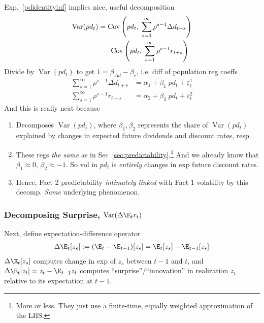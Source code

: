 \documentclass[12pt]{article}
\theoremstyle{plain}
\theoremstyle{definition}
\theoremstyle{remark}
\newcommand{\Cov}{\operatorname{Cov}}
\newcommand{\Var}{\operatorname{Var}}
\begin{document}
\begin{multicols*}{2}
Exp.~\ref{pdidentityinf} implies nice, useful decomposition
\begin{align}
  \Var(pd_t)
  &=
  \Cov\left(
    pd_t,\;
    \sum_{s=1}^\infty \rho^{s-1}\Delta d_{t+s}
  \right)
  \notag
  \\
  &\;\;
  -
  \Cov\left(
    pd_t,\;
    \sum_{s=1}^\infty \rho^{s-1}r_{t+s}
  \right)
  \notag
\end{align}
Divide by $\Var(pd_t)$ to get $1=\beta_{\Delta d}-\beta_{r}$, i.e.  diff
of population reg coeffs
\begin{align*}
  \sum_{s=1}^\infty \rho^{s-1}\Delta d_{t+s}
  &= \alpha_{1} + \beta_{1}\; pd_t
  + \varepsilon^{1}_t
  \\
  \sum_{s=1}^\infty \rho^{s-1}r_{t+s}
  &= \alpha_{2} + \beta_{2}\; pd_t + \varepsilon^2_t
\end{align*}
And this is really neat because
\begin{enumerate}
  \item
    Decomposes $\Var(pd_t)$, where $\beta_{1},\beta_2$ represents
    the share of $\Var(pd_t)$ explained by changes in expected future
    dividends and discount rates, resp.

  \item
    These regs \emph{the same} as in
    Sec~\ref{sec:predictability}.\footnote{%
      More or less.
      They just use a finite-time, equally weighted approximation of the
      LHS.
    }
    And we already know that $\beta_{1}\approx 0$, $\beta_2\approx -1$.
    So vol in $pd_t$ is \emph{entirely} changes in exp future discount
    rates.

  \item
    Hence, Fact 2 predictability \emph{intimately linked} with Fact 1
    volatility by this decomp.
    \emph{Same} underlying phenomenon.
\end{enumerate}


\subsubsection{Decomposing Surprise, $\Var(\Delta \E_t r_t)$}
\label{sec:decompsur}

Next, define expectation-difference operator
\begin{align*}
  \Delta \E_t[z_s]
  := (\E_t - \E_{t-1})[z_s]
  = \E_t[z_s] - \E_{t-1}[z_s]
\end{align*}
$\Delta\E_t[z_s]$ computes change in exp of $z_s$ between $t-1$ and $t$,
and $\Delta \E_t[z_t]=z_t-\E_{t-1}z_t$ computes
``surprise''/``innovation'' in realization $z_t$ relative to its
expectation at $t-1$.


\end{multicols*}
\end{document}

